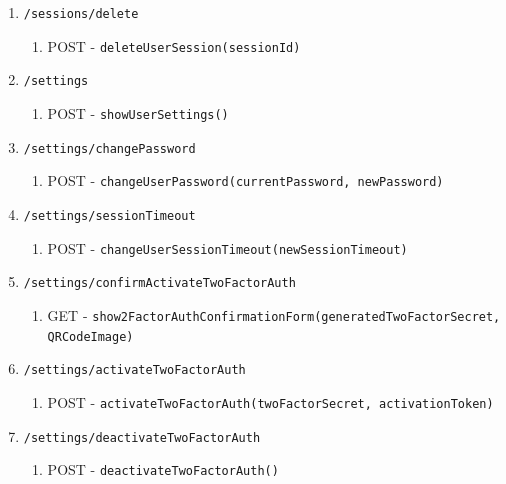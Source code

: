 \documentclass[12pt,DIV14,BCOR10mm,a4paper,parskip=half-,headsepline,headinclude,english,ngerman,bibliography=totocnumbered]{scrreprt}
\begin{document}
\begin{enumerate}
\begin{enumerate}
\begin{enumerate}
      \item \texttt{/sessions/delete}
      \begin{enumerate}
        \item POST - \texttt{deleteUserSession(sessionId)}
      \end{enumerate}
      \item \texttt{/settings}
      \begin{enumerate}
        \item POST - \texttt{showUserSettings()}
      \end{enumerate}
      \item \texttt{/settings/changePassword}
      \begin{enumerate}
        \item POST - \texttt{changeUserPassword(currentPassword, newPassword)}
      \end{enumerate}
      \item \texttt{/settings/sessionTimeout}
      \begin{enumerate}
        \item POST - \texttt{changeUserSessionTimeout(newSessionTimeout)}
      \end{enumerate}

      \item \texttt{/settings/confirmActivateTwoFactorAuth}
      \begin{enumerate}
        \item GET - \texttt{show2FactorAuthConfirmationForm(generatedTwoFactorSecret, QRCodeImage)}
      \end{enumerate}
      \item \texttt{/settings/activateTwoFactorAuth}
      \begin{enumerate}
        \item POST - \texttt{activateTwoFactorAuth(twoFactorSecret, activationToken)}
      \end{enumerate}
      \item \texttt{/settings/deactivateTwoFactorAuth}
      \begin{enumerate}
        \item POST - \texttt{deactivateTwoFactorAuth()}
      \end{enumerate}
    \end{enumerate}


\end{enumerate}
\end{enumerate}
\end{document}
